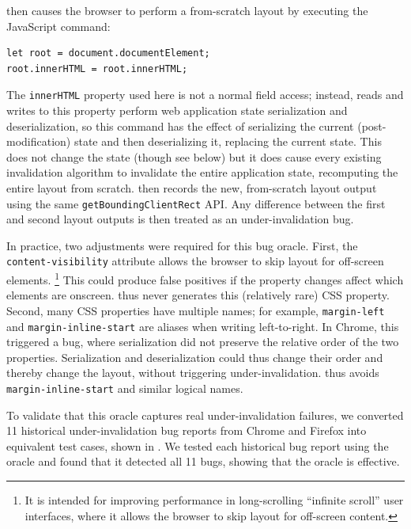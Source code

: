 \toolname then causes the browser to perform
  a from-scratch layout by executing the JavaScript command:
\begin{verbatim}
let root = document.documentElement;
root.innerHTML = root.innerHTML;
\end{verbatim}
The \texttt{innerHTML} property used here is not a normal field access;
  instead, reads and writes to this property perform
  web application state serialization and deserialization,
  so this command has the effect of serializing the current
  (post-modification) state
  and then deserializing it, replacing the current state.
This does not change the state (though see below)
  but it does cause every existing invalidation algorithm
  to invalidate the entire application state,
  recomputing the entire layout from scratch.
\toolname then records the new, from-scratch layout output
  using the same \texttt{getBoundingClientRect} API.
Any difference between the first and second layout outputs
  is then treated as an under-invalidation bug.

In practice, two adjustments were required for
  this bug oracle.
First, the \texttt{content-visibility} attribute
  allows the browser to skip layout for off-screen elements.%
\footnote{It is intended for improving performance in
  long-scrolling ``infinite scroll'' user interfaces,
  where it allows the browser to skip layout for
  off-screen content.}
This could produce false positives
  if the property changes affect which elements are onscreen.
\toolname thus never generates this (relatively rare) CSS property.
Second, many CSS properties have multiple names;
  for example, \texttt{margin-left} and \texttt{margin-inline-start}
  are aliases when writing left-to-right.
In Chrome, this triggered a bug, where serialization
  did not preserve the relative order of the two properties.
Serialization and deserialization could thus change their order
  and thereby change the layout, without triggering under-invalidation.
\toolname thus avoids \texttt{margin-inline-start} and similar logical names.

To validate that this oracle captures real under-invalidation failures,
  we converted 11 historical under-invalidation bug reports
  from Chrome and Firefox
  into equivalent \toolname test cases, shown in .
We tested each historical bug report using the \toolname oracle
  and found that it detected all 11 bugs, showing that the oracle is effective.



